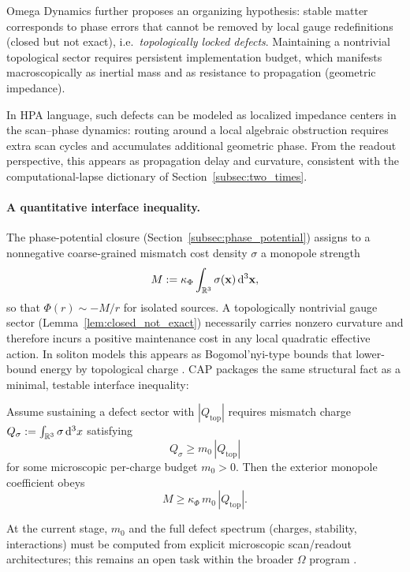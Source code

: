 Omega Dynamics further proposes an organizing hypothesis: stable matter corresponds to phase errors that cannot be removed by local gauge redefinitions (closed but not exact), i.e.\ \emph{topologically locked defects}. Maintaining a nontrivial topological sector requires persistent implementation budget, which manifests macroscopically as inertial mass and as resistance to propagation (geometric impedance).

In HPA language, such defects can be modeled as localized impedance centers in the scan--phase dynamics: routing around a local algebraic obstruction requires extra scan cycles and accumulates additional geometric phase. From the readout perspective, this appears as propagation delay and curvature, consistent with the computational-lapse dictionary of Section~\ref{subsec:two_times}.

\paragraph{A quantitative interface inequality.}
The phase-potential closure (Section~\ref{subsec:phase_potential}) assigns to a nonnegative coarse-grained mismatch cost density $\sigma$ a monopole strength
\begin{equation}
  M := \kappa_\Phi \int_{\mathbb{R}^3}\sigma(\mathbf{x})\,\mathrm{d}^3\mathbf{x},
\end{equation}
so that $\Phi(r)\sim -M/r$ for isolated sources. A topologically nontrivial gauge sector (Lemma~\ref{lem:closed_not_exact}) necessarily carries nonzero curvature and therefore incurs a positive maintenance cost in any local quadratic effective action. In soliton models this appears as Bogomol'nyi-type bounds that lower-bound energy by topological charge \cite{MantonSutcliffe2004,Rajaraman1982}. CAP packages the same structural fact as a minimal, testable interface inequality:
\begin{proposition}
\label{prop:topo_mass_bound}
Assume sustaining a defect sector with $|Q_{\mathrm{top}}|$ requires mismatch charge $Q_\sigma:=\int_{\mathbb{R}^3}\sigma\,\mathrm{d}^3x$ satisfying
\begin{equation}
  Q_\sigma \ge m_{0}\,|Q_{\mathrm{top}}|
\end{equation}
for some microscopic per-charge budget $m_0>0$. Then the exterior monopole coefficient obeys
\begin{equation}
  M \ge \kappa_\Phi\, m_{0}\,|Q_{\mathrm{top}}|.
\end{equation}
\end{proposition}

At the current stage, $m_0$ and the full defect spectrum (charges, stability, interactions) must be computed from explicit microscopic scan/readout architectures; this remains an open task within the broader $\Omega$ program \cite{Ma2025FoP}.


